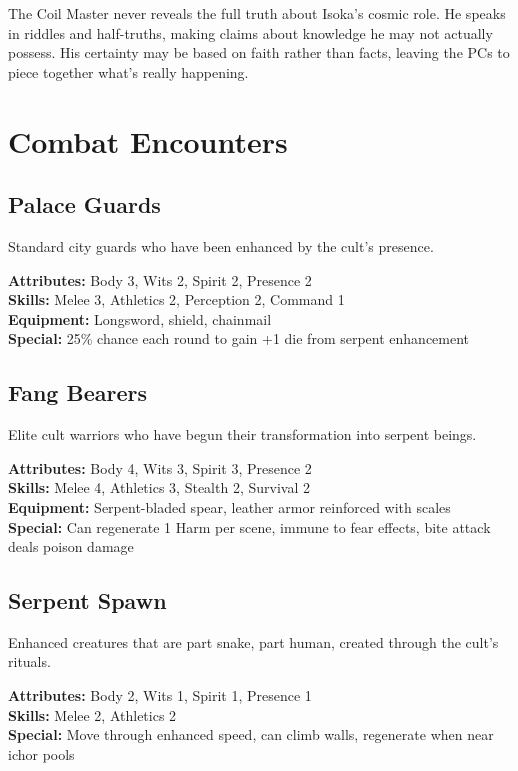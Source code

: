 \documentclass[12pt,twoside]{article}
\begin{document}
The Coil Master never reveals the full truth about Isoka's cosmic role. He speaks in riddles and half-truths, making claims about knowledge he may not actually possess. His certainty may be based on faith rather than facts, leaving the PCs to piece together what's really happening.

\section{Combat Encounters}

\subsection{Palace Guards}

Standard city guards who have been enhanced by the cult's presence.

\textbf{Attributes:} Body 3, Wits 2, Spirit 2, Presence 2 \\
\textbf{Skills:} Melee 3, Athletics 2, Perception 2, Command 1 \\
\textbf{Equipment:} Longsword, shield, chainmail \\
\textbf{Special:} 25\% chance each round to gain +1 die from serpent enhancement

\subsection{Fang Bearers}

Elite cult warriors who have begun their transformation into serpent beings.

\textbf{Attributes:} Body 4, Wits 3, Spirit 3, Presence 2 \\
\textbf{Skills:} Melee 4, Athletics 3, Stealth 2, Survival 2 \\
\textbf{Equipment:} Serpent-bladed spear, leather armor reinforced with scales \\
\textbf{Special:} Can regenerate 1 Harm per scene, immune to fear effects, bite attack deals poison damage

\subsection{Serpent Spawn}

Enhanced creatures that are part snake, part human, created through the cult's rituals.

\textbf{Attributes:} Body 2, Wits 1, Spirit 1, Presence 1 \\
\textbf{Skills:} Melee 2, Athletics 2 \\
\textbf{Special:} Move through enhanced speed, can climb walls, regenerate when near ichor pools
\end{document}
